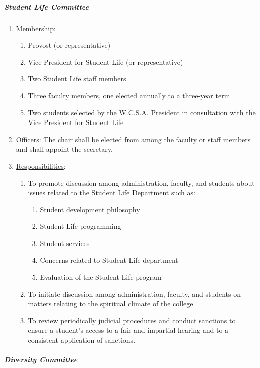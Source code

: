 				\subparagraph{Student Life Committee}
					\begin{enumerate}[label=\alph*)]
						\item{\underline{Membership}:
							\begin{enumerate}[label=\arabic*)]
								\item{Provost (or representative)}
								\item{Vice President for Student Life (or representative)}
								\item{Two Student Life staff members}
								\item{Three faculty members, one elected annually to a three-year term}
								\item{Two students selected by the W.C.S.A. President in consultation with the Vice President for Student Life}
							\end{enumerate}
						}
						\item{\underline{Officers}:
							The chair shall be elected from among the faculty or staff members and shall appoint the secretary.
						}
						\item{\underline{Responsibilities}:
							\begin{enumerate}[label=\arabic*)]
								\item{To promote discussion among administration, faculty, and students about issues related to the Student Life Department such as:
									\begin{enumerate}[label=(\alph*)]
										\item{Student development philosophy}
										\item{Student Life programming}
										\item{Student services}
										\item{Concerns related to Student Life department}
										\item{Evaluation of the Student Life program}
									\end{enumerate}
								}
								\item{To initiate discussion among administration, faculty, and students on matters relating to the spiritual climate of the college}
								\item{To review periodically judicial procedures and conduct sanctions to ensure a student's access to a fair and impartial hearing and to a consistent application of sanctions.}
							\end{enumerate}
						}
					\end{enumerate}
				\subparagraph{Diversity Committee}
